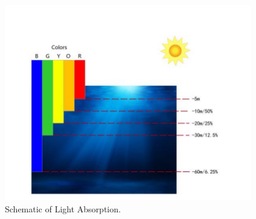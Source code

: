 \documentclass[10pt,twocolumn,letterpaper]{article}
\begin{document}
\begin{figure}[htbp]
	\begin{center}
		\includegraphics[scale=0.2]{light.png}
	\end{center}
	\caption{Schematic of Light Absorption.}
	\label{light}
\end{figure}
  
 
\end{document}
